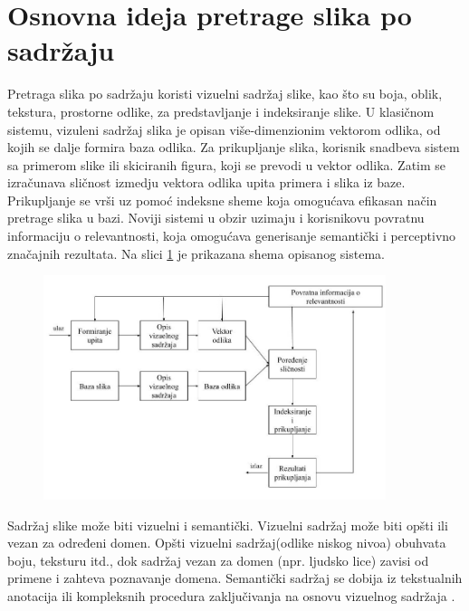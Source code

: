 \documentclass{article}
\begin{document}
\newpage
\section{Osnovna ideja pretrage slika po sadržaju}

Pretraga slika po sadržaju koristi vizuelni sadržaj slike, kao što su boja, oblik, tekstura, prostorne odlike, za predstavljanje i indeksiranje slike. U klasičnom sistemu, vizuleni sadržaj slika je opisan više-dimenzionim vektorom odlika, od kojih se dalje formira baza odlika. Za prikupljanje slika, korisnik snadbeva sistem sa primerom slike ili skiciranih figura, koji se prevodi u vektor odlika. Zatim se izračunava sličnost izmedju vektora odlika upita primera i slika iz baze. Prikupljanje se vrši uz pomoć indeksne sheme koja omogućava efikasan način pretrage slika u bazi. Noviji sistemi u obzir uzimaju i korisnikovu povratnu informaciju o relevantnosti, koja omogućava generisanje semantički i perceptivno značajnih rezultata. Na slici \ref{szpsp} je prikazana shema opisanog sistema.

\begin{figure}[htp]
    \centering
    \includegraphics[width=10cm]{SZPSP.jpg}
    \caption {}
    \label{szpsp}
\end{figure}

Sadržaj slike može biti vizuelni i semantički. Vizuelni sadržaj može biti opšti ili vezan za određeni domen.
Opšti vizuelni sadržaj(odlike niskog nivoa) obuhvata boju, teksturu itd., dok sadržaj vezan za domen (npr. ljudsko lice) zavisi od primene i zahteva poznavanje domena.
Semantički sadržaj se dobija iz tekstualnih anotacija ili kompleksnih procedura zaključivanja na osnovu vizuelnog sadržaja \cite{long2003fundamentals}.
\end{document}
